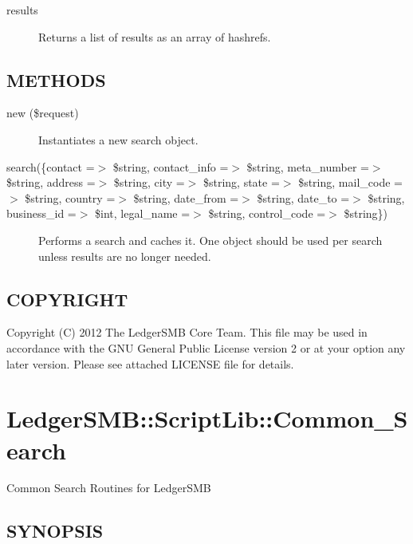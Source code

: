 \begin{description}
\begin{description}
\item[{results}] \mbox{}

Returns a list of results as an array of hashrefs.

\end{description}
\subsection*{METHODS\label{LedgerSMB::ScriptLib::Common_Search::Customer_METHODS}}
\begin{description}

\item[{new (\$request)}] \mbox{}

Instantiates a new search object.


\item[{search(\{contact =$>$ \$string, contact\_info =$>$ \$string,   meta\_number =$>$ \$string, address =$>$ \$string, city =$>$ \$string,   state =$>$ \$string, mail\_code =$>$ \$string, country =$>$ \$string,   date\_from =$>$ \$string, date\_to =$>$ \$string, business\_id =$>$ \$int,   legal\_name =$>$ \$string, control\_code =$>$ \$string\})}] \mbox{}

Performs a search and caches it.  One object should be used per search unless
results are no longer needed.

\end{description}
\subsection*{COPYRIGHT\label{LedgerSMB::ScriptLib::Common_Search::Customer_COPYRIGHT}}


Copyright (C) 2012 The LedgerSMB Core Team.  This file may be used in 
accordance with the GNU General Public License version 2 or at your option any
later version.  Please see attached LICENSE file for details.

\section{LedgerSMB::ScriptLib::Common\_Search\label{LedgerSMB::ScriptLib::Common_Search}}


Common Search Routines for LedgerSMB

\subsection*{SYNOPSIS\label{LedgerSMB::ScriptLib::Common_Search_SYNOPSIS}}



\end{description}
